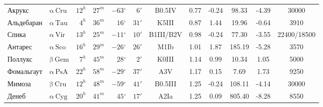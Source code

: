 \documentclass[a4paper,14pt]{article}
\renewcommand{\deg}{\ensuremath{^{\circ}}}
\begin{document}
\begin{landscape}
\begin{center}
\begin{normalsize}
\begin{tabular}{ll|rr|rr|cccccc}
Акрукс	&$\mathrm{	\alpha	~	Cru	}$&$	12	^h$&$	27	^m$&$	-63	\deg$&$	6	' $&	B0.5IV      	&	0.77	&	-0.24	&	98.33	&	-4.39	&	30000	\\
Альдебаран	&$\mathrm{	\alpha	~	Tau	}$&$	4	^h$&$	36	^m$&$	16	\deg$&$	31	' $&	K5III     	&	0.87	&	1.44	&	19.96	&	-0.64	&	3910	\\
Спика	&$\mathrm{	\alpha	~	Vir	}$&$	13	^h$&$	25	^m$&$	-11	\deg$&$	10	' $&	B1III/B2V    	&	0.98	&	-0.24	&	77.30	&	-3.55	&	22400/18500	\\
Антарес	&$\mathrm{	\alpha	~	Sco	}$&$	16	^h$&$	29	^m$&$	-26	\deg$&$	26' $&	M1Ib	&	1.01	&	1.87	&	185.19	&	-5.28	&	3570	\\
Поллукс	&$\mathrm{	\beta	~	Gem	}$&$	7	^h$&$	45	^m$&$	28	\deg$&$	2	' $&	K0III   	&	1.14	&	0.99	&	10.34	&	1.05	&	5000	\\
Фомальгаут	&$\mathrm{	\alpha	~	PsA	}$&$	22	^h$&$	58	^m$&$	-29	\deg$&$	37	' $&	A3V         	&	1.17	&	0.15	&	7.69	&	1.73	&	9250	\\
Мимоза	&$\mathrm{	\beta	~	Cru	}$&$	12	^h$&$	48	^m$&$	-59	\deg$&$	41	' $&	B0.5III     	&	1.25	&	-0.24	&	108.11	&	-4.14	&	30000	\\
Денеб	&$\mathrm{	\alpha	~	Cyg	}$&$	20	^h$&$	41	^m$&$	45	\deg$&$	17	' $&	A2Ia        	&	1.25	&	0.09	&	805.40	&	-8.28	&	8550	\\
\end{tabular}
\end{normalsize}
\end{center}



\end{landscape}
\end{document}
